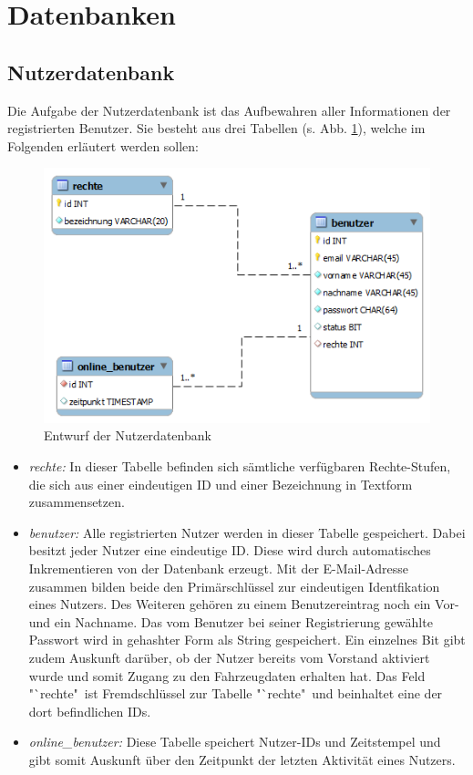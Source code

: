 \documentclass[fontsize = 12pt, paper = a4]{scrreprt}
\begin{document}
\section{Datenbanken}

\subsection{Nutzerdatenbank}

Die Aufgabe der Nutzerdatenbank ist das Aufbewahren aller Informationen der registrierten Benutzer. Sie besteht aus drei Tabellen (s. Abb. \ref{Nutzerdatenbank}), welche im Folgenden erläutert werden sollen:

\begin{figure}[h]
\centering
\includegraphics[scale = 0.6]{nutzerdatenbank} 
\caption [Entwurf Nutzerdatenbank]{Entwurf der Nutzerdatenbank}
\label{Nutzerdatenbank}
\end{figure} 

\newpage

\begin{itemize}
\item[1)] \textit{rechte:} 
In dieser Tabelle befinden sich sämtliche verfügbaren Rechte-Stufen, die sich aus einer eindeutigen ID und einer Bezeichnung in Textform zusammensetzen.

\item[2)] \textit{benutzer:} 
Alle registrierten Nutzer werden in dieser Tabelle gespeichert. Dabei besitzt jeder Nutzer eine eindeutige ID. Diese wird durch automatisches Inkrementieren von der Datenbank erzeugt. Mit der E-Mail-Adresse zusammen bilden beide den Primärschlüssel zur eindeutigen Identfikation eines Nutzers. Des Weiteren gehören zu einem Benutzereintrag noch ein Vor- und ein Nachname. Das vom Benutzer bei seiner Registrierung gewählte Passwort wird in gehashter Form als String gespeichert. Ein einzelnes Bit gibt zudem Auskunft darüber, ob der Nutzer bereits vom Vorstand aktiviert wurde und somit Zugang zu den Fahrzeugdaten erhalten hat. Das Feld "`rechte"\ ist Fremdschlüssel zur Tabelle "`rechte"\ und beinhaltet eine der dort befindlichen IDs.

\item[3)] \textit{online\_benutzer:} 
Diese Tabelle speichert Nutzer-IDs und Zeitstempel und gibt somit Auskunft über den Zeitpunkt der letzten Aktivität eines Nutzers.

\end{itemize}
\end{document}
